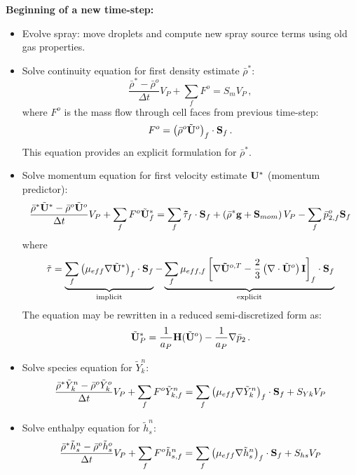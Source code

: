 \clearpage
\textbf{Beginning of a new time-step:}
\begin{itemize}
  \item Evolve spray: move droplets and compute new spray source terms using old gas properties.

  \item Solve continuity equation for first density estimate $\bar{\rho}^{*}$:
    \begin{equation}
      \frac{\bar{\rho}^{*}-\bar{\rho}^{o}}{\Delta t} V_P +\sum_f F^{o} = S_m V_P \, ,
    \end{equation}
    where $F^{o}$ is the mass flow through cell faces from previous time-step:
  \begin{equation}
    F^{o}=\left(\bar{\rho}^{o}\tilde{\mathbf{U}}^{o}\right)_f\cdot \mathbf{S}_f \, .
  \end{equation} 
  This equation provides an explicit formulation for $\bar{\rho}^{*}$.

  \item Solve momentum equation for first velocity estimate $\mathbf{U}^{*}$ (momentum predictor):
    \begin{equation}
      \frac{\bar{\rho}^{*}\tilde{\mathbf{U}}^{*}-\bar{\rho}^{o}\tilde{\mathbf{U}}^{o}}{\Delta t} V_P + \sum_f F^{o}\tilde{\mathbf{U}}_f^{*} = \sum_f \mathbf{\tilde{\tau}}_f \cdot \mathbf{S}_f+\left(\bar{\rho}^{*}\mathbf{g}+\mathbf{S}_{mom} \right)V_P - \sum_f \bar{p}_{2,f}^{o}\mathbf{S}_{f}
    \end{equation}
    where 
    \begin{equation}
    \tilde{\mathbf{\tau}}=\underbrace{\sum_f \left( \mu_{eff}\nabla\tilde{\mathbf{U}}^{*} \right)_f \cdot \mathbf{S}_f}_{\text{implicit}} - \underbrace{\sum_f \mu_{eff,f}\left[\nabla \mathbf{\tilde{U}}^{o,T} -\frac{2}{3}\left(\nabla\cdot\tilde{\mathbf{U}}^{o}\right)\mathbf{I}\right]_f \cdot \mathbf{S}_f}_{\text{explicit}}
    \end{equation}
    The equation may be rewritten in a reduced semi-discretized form as:
    \begin{equation}
      \tilde{\mathbf{U}}_P^{*} = \frac{1}{a_P}\mathbf{H}(\tilde{\mathbf{U}}^{o})-\frac{1}{a_P}\nabla \bar{p}_2 \, .
    \end{equation}
    
  \item Solve species equation for $\tilde{Y}^{n}_k$:
  \begin{equation}
    \frac{\bar{\rho}^{*}\tilde{Y}_k^{n}-\bar{\rho}^{o}\tilde{Y}_k^o}{\Delta t} V_P +\sum_f F^{o}\tilde{Y}_{k,f}^{n} = \sum_f \left(\mu_{eff}\nabla\tilde{Y}_{k}^{n}\right)_f \cdot \mathbf{S}_f + S_{Yk} V_P
  \end{equation}

  \item Solve enthalpy equation for $\tilde{h}_{s}^{n}$:
  \begin{equation}
    \frac{\bar{\rho}^{*}\tilde{h}_s^{n}-\bar{\rho}^{o}\tilde{h}_s^o}{\Delta t} V_P +\sum_f F^{o}\tilde{h}_{s,f}^{n} = \sum_f \left(\mu_{eff}\nabla\tilde{h}_{s}^{n}\right)_f \cdot \mathbf{S}_{f}  + S_{hs} V_P
  \end{equation}
\end{itemize}

